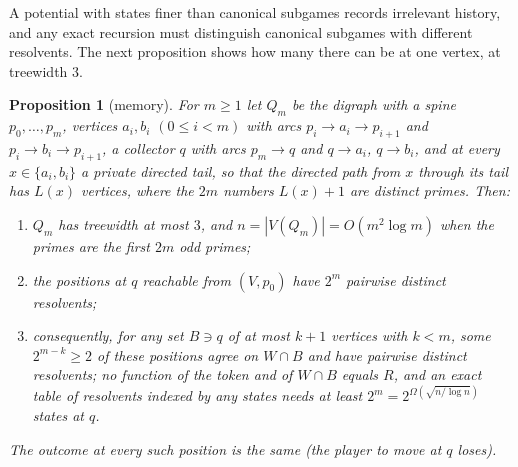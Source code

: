 \documentclass[11pt]{amsart}
\theoremstyle{plain}
\newtheorem{proposition}[theorem]{Proposition}
\theoremstyle{definition}
\theoremstyle{remark}
\numberwithin{equation}{section}
\begin{document}
A potential with states finer than canonical subgames records irrelevant history, and any exact recursion must distinguish canonical subgames with different resolvents. The next proposition shows how many there can be at one vertex, at treewidth $3$.

\begin{proposition}[memory]\label{prop:memory}
For $m\ge1$ let $Q_m$ be the digraph with a spine $p_0,\dots,p_m$, vertices $a_i,b_i$ $(0\le i<m)$ with arcs $p_i\to a_i\to p_{i+1}$ and $p_i\to b_i\to p_{i+1}$, a collector $q$ with arcs $p_m\to q$ and $q\to a_i$, $q\to b_i$, and at every $x\in\{a_i,b_i\}$ a private directed tail, so that the directed path from $x$ through its tail has $L(x)$ vertices, where the $2m$ numbers $L(x)+1$ are distinct primes. Then:
\begin{enumerate}[label=\textup{(\arabic*)}]
\item $Q_m$ has treewidth at most $3$, and $n=|V(Q_m)|=O(m^{2}\log m)$ when the primes are the first $2m$ odd primes;
\item the positions at $q$ reachable from $(V,p_0)$ have $2^{m}$ pairwise distinct resolvents;
\item consequently, for any set $B\ni q$ of at most $k+1$ vertices with $k<m$, some $2^{m-k}\ge2$ of these positions agree on $W\cap B$ and have pairwise distinct resolvents; no function of the token and of $W\cap B$ equals $R$, and an exact table of resolvents indexed by any states needs at least $2^{m}=2^{\Omega(\sqrt{n/\log n})}$ states at $q$.
\end{enumerate}
The outcome at every such position is the same \textup{(}the player to move at $q$ loses\textup{)}.
\end{proposition}
\end{document}
